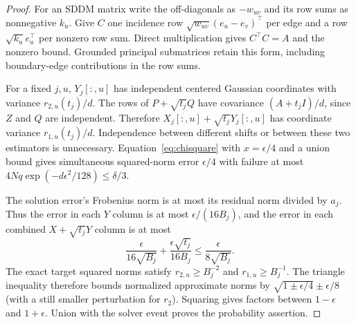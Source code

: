 \documentclass[11pt]{article}
\begin{document}
\begin{proof}
For an SDDM matrix write the off-diagonals as $-w_{uv}$ and its row
sums as nonnegative $k_u$. Give $C$ one incidence row
$\sqrt{w_{uv}}(e_u-e_v)^\top$ per edge and a row $\sqrt{k_u}e_u^\top$
per nonzero row sum. Direct multiplication gives $C^\top C=A$
and the nonzero bound. Grounded principal submatrices retain this
form, including boundary-edge contributions in the row sums.

For a fixed $j,u$, $Y_j[:,u]$ has independent centered Gaussian
coordinates with variance $r_{2,u}(t_j)/d$.
The rows of $P+\sqrt{t_j}Q$ have covariance
$(A+t_jI)/d$, since $Z$ and $Q$ are independent. Therefore
$X_j[:,u]+\sqrt{t_j}Y_j[:,u]$ has coordinate variance
$r_{1,u}(t_j)/d$. Independence between different shifts or between
these two estimators is unnecessary. Equation~\eqref{eq:chisquare}
with $x=\epsilon/4$ and a union bound gives simultaneous squared-norm
error $\epsilon/4$ with failure at most
$4Nq\exp(-d\epsilon^2/128)\leq\delta/3$.

The solution error's Frobenius norm is at most its residual norm
divided by $a_j$. Thus the error in each $Y$ column is at most
$\epsilon/(16B_j)$, and the error in each combined $X+\sqrt{t_j}Y$
column is at most
\[
 \frac{\epsilon}{16\sqrt{B_j}}
       +\frac{\epsilon\sqrt{t_j}}{16B_j}
 \leq\frac{\epsilon}{8\sqrt{B_j}}.
\]
The exact target squared norms satisfy
$r_{2,u}\geq B_j^{-2}$ and $r_{1,u}\geq B_j^{-1}$.
The triangle inequality therefore bounds normalized approximate
norms by $\sqrt{1\pm\epsilon/4}\pm\epsilon/8$ (with a still
smaller perturbation for $r_2$). Squaring gives factors between
$1-\epsilon$ and $1+\epsilon$. Union with the solver event proves
the probability assertion.


\end{proof}
\end{document}
